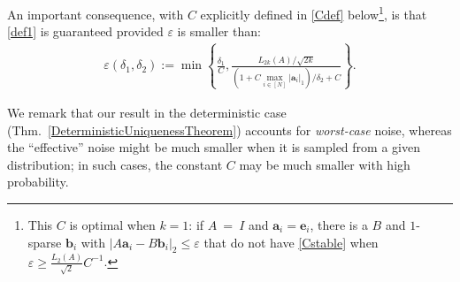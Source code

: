 \documentclass[journal, twocolumn]{IEEEtran}
\newtheorem{remark}{Remark}
\begin{document}

An important consequence, with $C$  explicitly defined in \eqref{Cdef} below\footnote{This $C$ is optimal when $k=1$: if \mbox{$A$ = $I$} and $\mathbf{a}_i = \mathbf{e}_i$, there is a $B$ and $1$-sparse $\mathbf{b}_i$ with $|A\mathbf{a}_i - B\mathbf{b}_i|_2 \leq \varepsilon$ that do not have \eqref{Cstable} when $\varepsilon \geq \frac{L_2(A)}{\sqrt{2}}C^{-1}$.}, is that \eqref{def1} is guaranteed provided $\varepsilon$ is smaller than:
\begin{align*}
\varepsilon(\delta_1, \delta_2) := \min \left\{ \frac{\delta_1}{ C }, \frac{ L_{2k}(A) / \sqrt{2k}}{\left(1 + C \max_{i \in [N]} |\mathbf{a}_i|_1 \right) / \delta_2 + C } \right\}.
\end{align*}
%

We remark that our result in the deterministic case (Thm.~\ref{DeterministicUniquenessTheorem}) accounts for \emph{worst-case} noise, whereas the ``effective'' noise might be much smaller when it is sampled from a given distribution; in such cases, the constant $C$ may be much smaller with high probability. 
\end{document}
